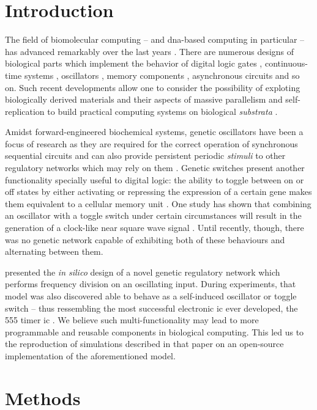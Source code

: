 \section{Introduction}

  The field of biomolecular computing -- and \acs{dna}-based computing in particular -- has advanced remarkably over the last years \cite{history}.
  There are numerous designs of biological parts which implement the behavior of digital logic gates \cite{reconfgate}, continuous-time systems \cite{analog}, oscillators \cite{repressilator}, memory components \cite{register}, asynchronous circuits \cite{async} and so on.
  Such recent developments allow one to consider the possibility of exploting biologically derived materials and their aspects of massive parallelism and self-replication to build practical computing systems on biological \textit{substrata} \cite{youtuber}.

  Amidst forward-engineered biochemical systems, genetic oscillators have been a focus of research \cite{optoscillator} as they are required for the correct operation of synchronous sequential circuits and can also provide persistent periodic \textit{stimuli} to other regulatory networks which may rely on them \cite{bioapps}.
  Genetic switches present another functionality specially useful \cite{bioapps} to digital logic: the ability to toggle between on or off states by either activating or repressing the expression of a certain gene makes them equivalent to a cellular memory unit \cite{youtuber}.
  One study has shown that combining an oscillator with a toggle switch under certain circumstances will result in the generation of a clock-like near square wave signal \cite{clock}.
  Until recently, though, there was no genetic network capable of exhibiting both of these behaviours and alternating between them.

  \citet{multif} presented the \textit{in silico} design of a novel genetic regulatory network which performs frequency division on an oscillating input.
  During experiments, that model was also discovered able to behave as a self-induced oscillator or toggle switch -- thus ressembling the most successful electronic \ac{ic} ever developed, the 555 timer \acs{ic} \cite{ic555}.
  We believe such multi-functionality may lead to more programmable and reusable components in biological computing. This led us to the reproduction of simulations described in that paper on an open-source implementation of the aforementioned model.


\section{Methods}

